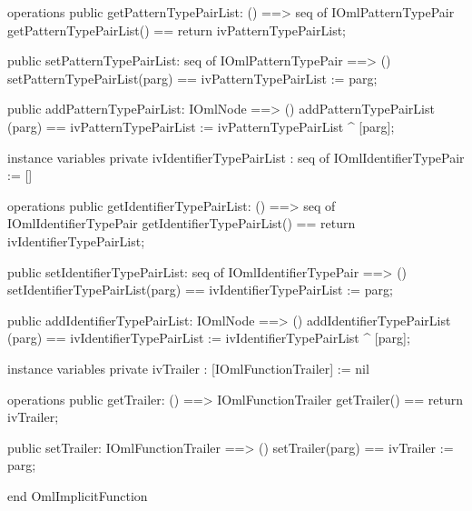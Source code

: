 \begin{vdm_al}
operations
  public getPatternTypePairList: () ==> seq of IOmlPatternTypePair
  getPatternTypePairList() == return ivPatternTypePairList;

  public setPatternTypePairList: seq of IOmlPatternTypePair ==> ()
  setPatternTypePairList(parg) == ivPatternTypePairList := parg;

  public addPatternTypePairList: IOmlNode ==> ()
  addPatternTypePairList (parg) == ivPatternTypePairList := ivPatternTypePairList ^ [parg];

instance variables
  private ivIdentifierTypePairList : seq of IOmlIdentifierTypePair := []

operations
  public getIdentifierTypePairList: () ==> seq of IOmlIdentifierTypePair
  getIdentifierTypePairList() == return ivIdentifierTypePairList;

  public setIdentifierTypePairList: seq of IOmlIdentifierTypePair ==> ()
  setIdentifierTypePairList(parg) == ivIdentifierTypePairList := parg;

  public addIdentifierTypePairList: IOmlNode ==> ()
  addIdentifierTypePairList (parg) == ivIdentifierTypePairList := ivIdentifierTypePairList ^ [parg];

instance variables
  private ivTrailer : [IOmlFunctionTrailer] := nil

operations
  public getTrailer: () ==> IOmlFunctionTrailer
  getTrailer() == return ivTrailer;

  public setTrailer: IOmlFunctionTrailer ==> ()
  setTrailer(parg) == ivTrailer := parg;

end OmlImplicitFunction
\end{vdm_al}

